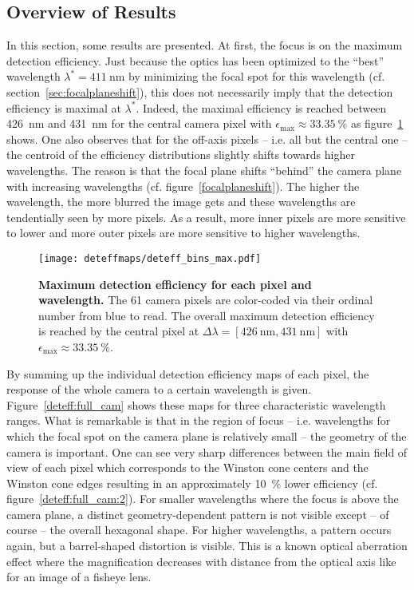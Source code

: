\subsection{Overview of Results}

In this section, some results are presented. At first, the focus is on the maximum detection efficiency. Just because the optics has been optimized to the \enquote{best} wavelength $\lambda^\ast=\SI{411}{\nano\meter}$ by minimizing the focal spot for this wavelength (cf. section~\ref{sec:focalplaneshift}), this does not necessarily imply that the detection efficiency is maximal at $\lambda^\ast$. Indeed, the maximal efficiency is reached between \SI{426}{\nano\meter} and \SI{431}{\nano\meter} for the central camera pixel with $\epsilon_\text{max}\approx\SI{33.35}{\percent}$ as figure~\ref{max_deteff} shows. One also observes that for the off-axis pixels -- i.e. all but the central one -- the centroid of the efficiency distributions slightly shifts towards higher wavelengths. The reason is that the focal plane shifts \enquote{behind} the camera plane with increasing wavelengths (cf. figure~\ref{focalplaneshift}). The higher the wavelength, the more blurred the image gets and these wavelengths are tendentially seen by more pixels. As a result, more inner pixels are more sensitive to lower and more outer pixels are more sensitive to higher wavelengths.\\

\begin{figure}[H]
	\centering
	\texttt{[image: deteffmaps/deteff\_bins\_max.pdf]}
	\caption[Maximum detection efficiency for each pixel and wavelength]{\textbf{Maximum detection efficiency for each pixel and wavelength.} The 61 camera pixels are color-coded via their ordinal number from blue to read. The overall maximum detection efficiency is reached by the central pixel at $\Delta\lambda=[\SI{426}{\nano\meter},\SI{431}{\nano\meter}]$ with $\epsilon_\text{max}\approx\SI{33.35}{\percent}$.}
	\label{max_deteff}
\end{figure}

By summing up the individual detection efficiency maps of each pixel, the response of the whole camera to a certain wavelength is given. Figure~\ref{deteff:full_cam} shows these maps for three characteristic wavelength ranges. What is remarkable is that in the region of focus -- i.e. wavelengths for which the focal spot on the camera plane is relatively small -- the geometry of the camera is important. One can see very sharp differences between the main field of view of each pixel which corresponds to the Winston cone centers and the Winston cone edges resulting in an approximately \SI{10}{\percent} lower efficiency (cf. figure~\ref{deteff:full_cam:2}). For smaller wavelengths where the focus is above the camera plane, a distinct geometry-dependent pattern is not visible except -- of course -- the overall hexagonal shape. For higher wavelengths, a pattern occurs again, but a barrel-shaped distortion is visible. This is a known optical aberration effect where the magnification decreases with distance from the optical axis like for an image of a fisheye lens.\\

